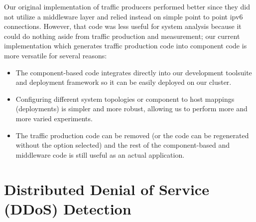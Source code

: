\begin{definition}[Note:]
Our original implementation of traffic producers performed
	  better since they did not utilize a middleware layer and
	  relied instead on simple point to point ipv6 connections.
	  However, that code was less useful for system analysis
	  because it could do nothing aside from traffic production
	  and measurement; our current implementation which generates
	  traffic production code into component code is more
	  versatile for several reasons:

          \begin{itemize}
	  \item The component-based code integrates directly into our development
	    toolsuite and deployment framework so it can be easily deployed on
	    our cluster.
	  \item Configuring different system topologies or component to host
	    mappings (deployments) is simpler and more robust, allowing us to
	    perform more and more varied experiments.
	  \item The traffic production code can be removed (or the code can be
	    regenerated without the option selected) and the rest of the
	    component-based and middleware code is still useful as an actual
	    application.
          \end{itemize}
\end{definition}

\fi

\newpage
\section{Distributed Denial of Service (DDoS) Detection}
\label{sec:ddos}

